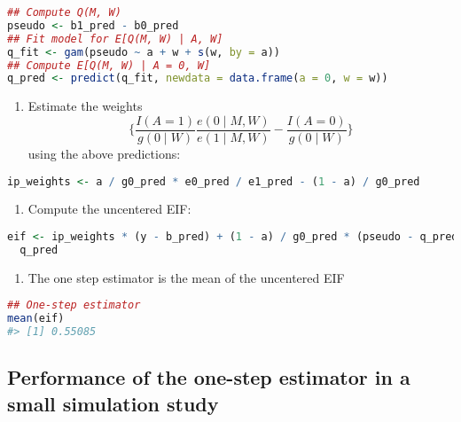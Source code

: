 \documentclass[
  12pt,
]{book}
\providecommand{\tightlist}{%
  \setlength{\itemsep}{0pt}\setlength{\parskip}{0pt}}
\theoremstyle{definition}
\theoremstyle{definition}
\theoremstyle{definition}
\newcommand{\1}{\mathbbm{1}}
\begin{document}
\begin{lstlisting}[language=R]
## Compute Q(M, W)
pseudo <- b1_pred - b0_pred
## Fit model for E[Q(M, W) | A, W]
q_fit <- gam(pseudo ~ a + w + s(w, by = a))
## Compute E[Q(M, W) | A = 0, W]
q_pred <- predict(q_fit, newdata = data.frame(a = 0, w = w))
\end{lstlisting}

\begin{enumerate}
\def\labelenumi{\arabic{enumi}.}
\setcounter{enumi}{3}
\tightlist
\item
  Estimate the weights
  \begin{equation*}
    \bigg\{ \frac{I(A=1)}{g(0\mid W)}\frac{e(0\mid M,W)}{e(1\mid M,W)} -
     \frac{I(A=0)}{g(0\mid W)}\bigg\}
    \end{equation*}
  using the above predictions:
\end{enumerate}

\begin{lstlisting}[language=R]
ip_weights <- a / g0_pred * e0_pred / e1_pred - (1 - a) / g0_pred
\end{lstlisting}

\begin{enumerate}
\def\labelenumi{\arabic{enumi}.}
\setcounter{enumi}{4}
\tightlist
\item
  Compute the uncentered EIF:
\end{enumerate}

\begin{lstlisting}[language=R]
eif <- ip_weights * (y - b_pred) + (1 - a) / g0_pred * (pseudo - q_pred) +
  q_pred
\end{lstlisting}

\begin{enumerate}
\def\labelenumi{\arabic{enumi}.}
\setcounter{enumi}{5}
\tightlist
\item
  The one step estimator is the mean of the uncentered EIF
\end{enumerate}

\begin{lstlisting}[language=R]
## One-step estimator
mean(eif)
#> [1] 0.55085
\end{lstlisting}

\hypertarget{performance-of-the-one-step-estimator-in-a-small-simulation-study}{%
\subsection{Performance of the one-step estimator in a small simulation study}\label{performance-of-the-one-step-estimator-in-a-small-simulation-study}}
\end{document}
